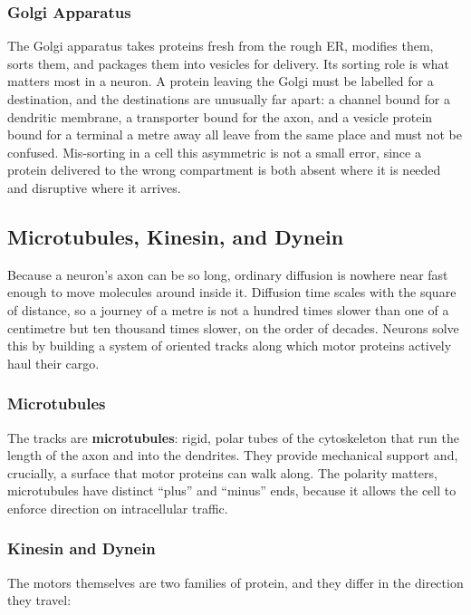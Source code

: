 \documentclass[11pt]{article}
\begin{document}
\subsubsection{Golgi Apparatus}

The Golgi apparatus takes proteins fresh from the rough ER, modifies them, sorts them, and packages them into vesicles for delivery. Its sorting role is what matters most in a neuron. A protein leaving the Golgi must be labelled for a destination, and the destinations are unusually far apart: a channel bound for a dendritic membrane, a transporter bound for the axon, and a vesicle protein bound for a terminal a metre away all leave from the same place and must not be confused. Mis-sorting in a cell this asymmetric is not a small error, since a protein delivered to the wrong compartment is both absent where it is needed and disruptive where it arrives.

\subsection{Microtubules, Kinesin, and Dynein}

Because a neuron's axon can be so long, ordinary diffusion is nowhere near fast enough to move molecules around inside it. Diffusion time scales with the square of distance, so a journey of a metre is not a hundred times slower than one of a centimetre but ten thousand times slower, on the order of decades. Neurons solve this by building a system of oriented tracks along which motor proteins actively haul their cargo.

\subsubsection{Microtubules}

The tracks are \textbf{microtubules}: rigid, polar tubes of the cytoskeleton that run the length of the axon and into the dendrites. They provide mechanical support and, crucially, a surface that motor proteins can walk along. The polarity matters, microtubules have distinct ``plus'' and ``minus'' ends, because it allows the cell to enforce direction on intracellular traffic.

\subsubsection{Kinesin and Dynein}

The motors themselves are two families of protein, and they differ in the direction they travel:
\end{document}
